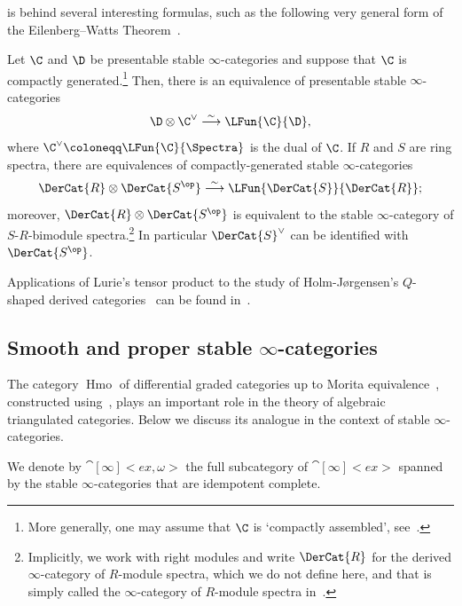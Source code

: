\documentclass[a4paper]{amsart}
\begin{document}
 is behind several interesting formulas, such as
the following very general form of the Eilenberg--Watts
Theorem~\cite{Eil60,Wat60}.

\begin{theorem}
  Let $\C$ and $\D$ be presentable stable $\infty$-categories and suppose that
  $\C$ is compactly generated.\footnote{More generally, one may assume that $\C$
  is `compactly assembled', see~.} Then, there is an equivalence of presentable
  stable $\infty$-categories
  \[
    \D\otimes\C^\vee\stackrel{\sim}{\longrightarrow}\LFun{\C}{\D},
  \]
  where $\C^\vee\coloneqq\LFun{\C}{\Spectra}$ is the dual of $\C$. If $R$ and
  $S$ are ring spectra, there are equivalences of
  compactly-generated stable $\infty$-categories
  \[
    \DerCat{R}\otimes\DerCat{S^\op}\stackrel{\sim}{\longrightarrow}\LFun{\DerCat{S}}{\DerCat{R}};
  \]
  moreover, $\DerCat{R}\otimes\DerCat{S^\op}$ is equivalent to the stable
  $\infty$-category of $S$-$R$-bimodule spectra.\footnote{Implicitly, we work
    with right modules and write $\DerCat{R}$ for the derived $\infty$-category
    of $R$-module spectra, which we do not define here, and that is simply
    called the $\infty$-category of $R$-module spectra in~\cite{Lur17}.} In
  particular $\DerCat{S}^\vee$ can be identified with $\DerCat{S^{\op}}$.
\end{theorem}

\begin{remark}
  Applications of Lurie's tensor product to the study of Holm-J{\o}r\-gen\-sen's
  $Q$-shaped derived categories~\cite{HJ22} can be found
  in~\cite[Remark.~3.23]{Jas25}.
\end{remark}

\subsection{Smooth and proper stable $\infty$-categories}

The category $\operatorname{Hmo}$ of differential graded categories up to Morita
equivalence~\cite{Toe07}, constructed using~\cite[Théorème~5.3]{Tab05}, plays an
important role in the theory of algebraic triangulated categories. Below we
discuss its analogue in the context of stable
$\infty$-categories.

\begin{definition}
  We denote by $\cat[\infty]<ex,\omega>$ the full subcategory of
  $\cat[\infty]<ex>$ spanned by the stable $\infty$-categories that are
  idempotent complete.
\end{definition}
\end{document}
